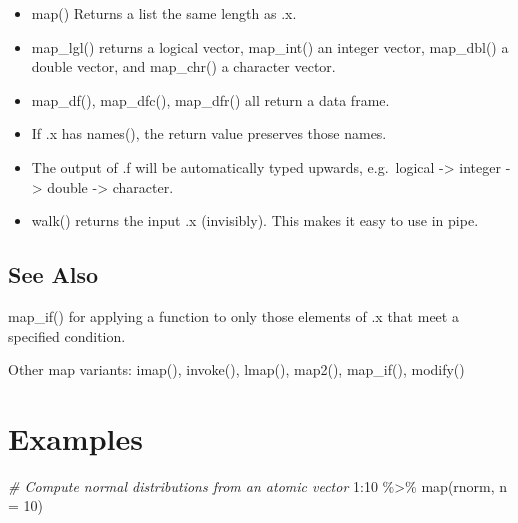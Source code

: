 \documentclass[
]{book}
\newenvironment{Shaded}{\begin{snugshade}}{\end{snugshade}}
\newcommand{\AttributeTok}[1]{\textcolor[rgb]{0.77,0.63,0.00}{#1}}
\newcommand{\CommentTok}[1]{\textcolor[rgb]{0.56,0.35,0.01}{\textit{#1}}}
\newcommand{\DecValTok}[1]{\textcolor[rgb]{0.00,0.00,0.81}{#1}}
\newcommand{\FunctionTok}[1]{\textcolor[rgb]{0.00,0.00,0.00}{#1}}
\newcommand{\NormalTok}[1]{#1}
\newcommand{\SpecialCharTok}[1]{\textcolor[rgb]{0.00,0.00,0.00}{#1}}
\begin{document}
\begin{itemize}
\item
  map() Returns a list the same length as .x.
\item
  map\_lgl() returns a logical vector, map\_int() an integer vector, map\_dbl() a double vector, and map\_chr() a character vector.
\item
  map\_df(), map\_dfc(), map\_dfr() all return a data frame.
\item
  If .x has names(), the return value preserves those names.
\item
  The output of .f will be automatically typed upwards, e.g.~logical -\textgreater{} integer -\textgreater{} double -\textgreater{} character.
\item
  walk() returns the input .x (invisibly). This makes it easy to use in pipe.
\end{itemize}

\hypertarget{see-also}{%
\subsection{See Also}\label{see-also}}

map\_if() for applying a function to only those elements of .x that meet a specified condition.

Other map variants: imap(), invoke(), lmap(), map2(), map\_if(), modify()

\hypertarget{examples}{%
\section{Examples}\label{examples}}

\begin{Shaded}
\begin{Highlighting}[]
\CommentTok{\# Compute normal distributions from an atomic vector}
\DecValTok{1}\SpecialCharTok{:}\DecValTok{10} \SpecialCharTok{\%\textgreater{}\%}
  \FunctionTok{map}\NormalTok{(rnorm, }\AttributeTok{n =} \DecValTok{10}\NormalTok{)}
\end{Highlighting}
\end{Shaded}
\end{document}
